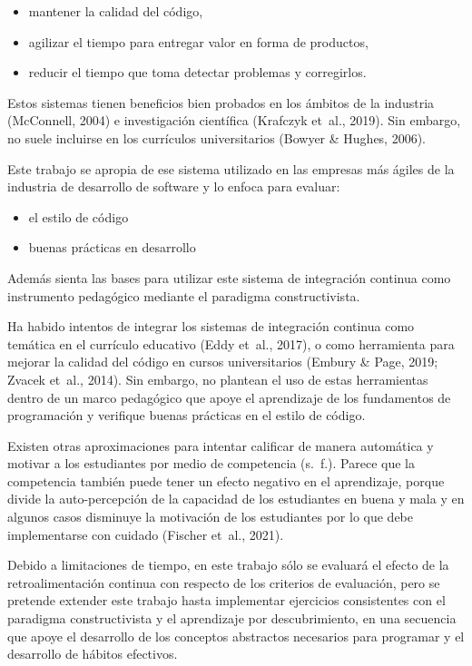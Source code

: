 \documentclass[
  12,
]{scrartcl}
\providecommand{\tightlist}{%
  \setlength{\itemsep}{0pt}\setlength{\parskip}{0pt}}
\begin{document}
\begin{itemize}
\tightlist
\item
  mantener la calidad del código,
\item
  agilizar el tiempo para entregar valor en forma de productos,
\item
  reducir el tiempo que toma detectar problemas y corregirlos.
\end{itemize}

Estos sistemas tienen beneficios bien probados en los ámbitos de la
industria (McConnell, 2004) e investigación científica (Krafczyk et~al.,
2019). Sin embargo, no suele incluirse en los currículos universitarios
(Bowyer \& Hughes, 2006).

Este trabajo se apropia de ese sistema utilizado en las empresas más
ágiles de la industria de desarrollo de software y lo enfoca para
evaluar:

\begin{itemize}
\tightlist
\item
  el estilo de código
\item
  buenas prácticas en desarrollo
\end{itemize}

Además sienta las bases para utilizar este sistema de integración
continua como instrumento pedagógico mediante el paradigma
constructivista.

Ha habido intentos de integrar los sistemas de integración continua como
temática en el currículo educativo (Eddy et~al., 2017), o como
herramienta para mejorar la calidad del código en cursos universitarios
(Embury \& Page, 2019; Zvacek et~al., 2014). Sin embargo, no plantean el
uso de estas herramientas dentro de un marco pedagógico que apoye el
aprendizaje de los fundamentos de programación y verifique buenas
prácticas en el estilo de código.

Existen otras aproximaciones para intentar calificar de manera
automática y motivar a los estudiantes por medio de competencia (s.~f.).
Parece que la competencia también puede tener un efecto negativo en el
aprendizaje, porque divide la auto-percepción de la capacidad de los
estudiantes en buena y mala y en algunos casos disminuye la motivación
de los estudiantes por lo que debe implementarse con cuidado (Fischer
et~al., 2021).

Debido a limitaciones de tiempo, en este trabajo sólo se evaluará el
efecto de la retroalimentación continua con respecto de los criterios de
evaluación, pero se pretende extender este trabajo hasta implementar
ejercicios consistentes con el paradigma constructivista y el
aprendizaje por descubrimiento, en una secuencia que apoye el desarrollo
de los conceptos abstractos necesarios para programar y el desarrollo de
hábitos efectivos.
\end{document}
